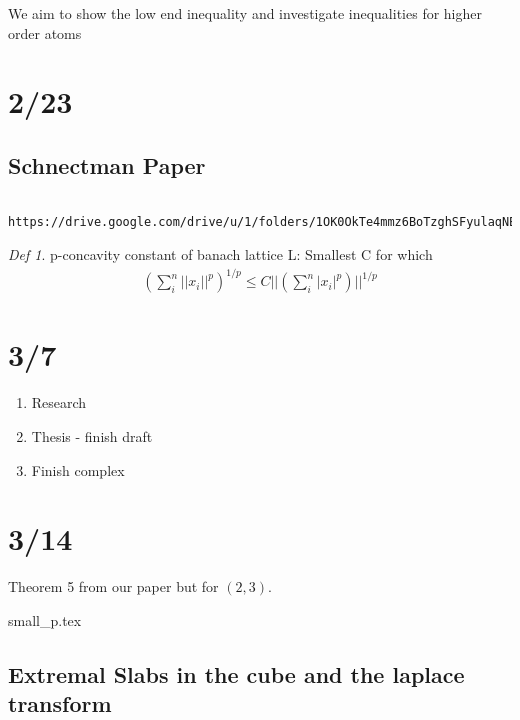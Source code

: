 \documentclass[11pt]{article}
\theoremstyle{remark}
\newtheorem*{defi}{Def}
\begin{document}
\begin{remark}
	We aim to show the low end inequality and investigate inequalities for higher order atoms
\end{remark}

\section{2/23}

\subsection{Schnectman Paper}

\begin{verbatim}
	https://drive.google.com/drive/u/1/folders/1OK0OkTe4mmz6BoTzghSFyulaqNEpw1ML
\end{verbatim}

\begin{defi}
	p-concavity constant of banach lattice L: Smallest C for which
	\begin{align*}
		(\sum_i^n ||x_i||^p)^{1/p} \leq C ||(\sum_i^n |x_i|^p)||^{1/p}
	\end{align*}
\end{defi}


\section{3/7}

\begin{enumerate}
	\item Research
	\item Thesis - finish draft
	\item Finish complex
\end{enumerate}



\section{3/14}


\begin{enumerate}
	Theorem 5 from our paper but for $(2,3)$. 
\end{enumerate}


small_p.tex

\subsection{Extremal Slabs in the cube and the laplace transform}
\end{document}

